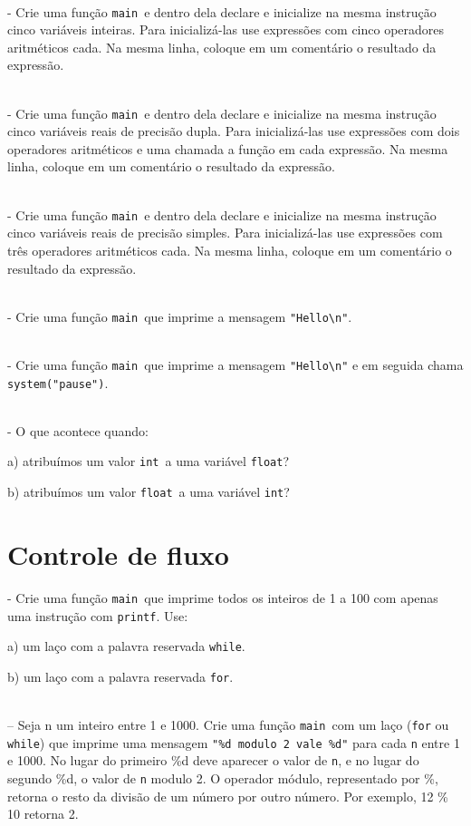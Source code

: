 \documentclass{book}
\newcommand{\NEWLINE}{~\\}
\newcommand{\INT}{{\tt int}}
\newcommand{\FLOAT}{{\tt float}}
\newcommand{\FOR}{{\tt for}}
\newcommand{\WHILE}{{\tt while}}
\newcommand{\MAIN}{{\tt main}}
\newcommand{\PRINTF}{{\tt printf}}
\begin{document}
\NEWLINE
\quest - Crie uma função \MAIN\ e dentro dela declare e inicialize na mesma instrução cinco variáveis inteiras. Para inicializá-las use expressões com cinco operadores aritméticos cada. Na mesma linha, coloque em um comentário o resultado da expressão.

\NEWLINE
\quest - Crie uma função \MAIN\ e dentro dela declare e inicialize na mesma instrução cinco variáveis reais de precisão dupla. Para inicializá-las use expressões com dois operadores aritméticos e uma chamada a função em cada expressão. Na mesma linha, coloque em um comentário o resultado da expressão.

\NEWLINE
\quest - Crie uma função \MAIN\ e dentro dela declare e inicialize na mesma instrução cinco variáveis reais de precisão simples. Para inicializá-las use expressões com três operadores aritméticos cada. Na mesma linha, coloque em um comentário o resultado da expressão.

\NEWLINE
\quest - Crie uma função \MAIN\ que imprime a mensagem \verb|"Hello\n"|.

\NEWLINE
\quest - Crie uma função \MAIN\ que imprime a mensagem \verb|"Hello\n"| e em seguida chama \verb|system("pause")|.

\NEWLINE
\quest - O que acontece quando:

	a) atribuímos um valor \INT\ a uma variável \FLOAT?

	b) atribuímos um valor \FLOAT\ a uma variável \INT?


\zeraquest

\section{Controle de fluxo}

\quest - Crie uma função \MAIN\ que imprime todos os inteiros de 1 a 100 com apenas uma instrução com \PRINTF. Use:

	a) um laço com a palavra reservada \WHILE.

	b) um laço com a palavra reservada \FOR.

\NEWLINE
\quest – Seja n um inteiro entre 1 e 1000. Crie uma função \MAIN\ com um laço ({\tt for} ou {\tt while}) que imprime uma mensagem \verb|"%d modulo 2 vale %d"| para cada {\tt n} entre 1 e 1000. No lugar do primeiro \%d deve aparecer o valor de {\tt n}, e no lugar do segundo \%d, o valor de {\tt n} modulo 2. O operador módulo, representado por \%, retorna o resto da divisão de um número por outro número. Por exemplo, 12 \% 10 retorna 2.
\end{document}

